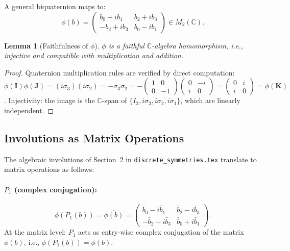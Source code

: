 \documentclass[12pt,a4paper]{article}
\newtheorem{lemma}[theorem]{Lemma}
\theoremstyle{definition}
\theoremstyle{remark}
\begin{document}
A general biquaternion maps to:
\begin{equation}
  \phi(b) = \begin{pmatrix}
    b_0 + ib_1 & b_2 + ib_3 \\
    -b_2 + ib_3 & b_0 - ib_1
  \end{pmatrix} \in M_2(\mathbb{C}).
  \label{eq:mat:general_2x2}
\end{equation}

\begin{lemma}[Faithfulness of $\phi$]
$\phi$ is a faithful $\mathbb{C}$-algebra homomorphism, i.e., injective and
compatible with multiplication and addition.
\end{lemma}
\begin{proof}
Quaternion multiplication rules are verified by direct computation:
$\phi(\mathbf{I})\phi(\mathbf{J}) = (i\sigma_3)(i\sigma_2) = -\sigma_3\sigma_2
= -\begin{pmatrix}1&0\\0&-1\end{pmatrix}\begin{pmatrix}0&-i\\i&0\end{pmatrix}
= \begin{pmatrix}0&i\\i&0\end{pmatrix} = \phi(\mathbf{K})$. \checkmark
Injectivity: the image is the $\mathbb{C}$-span of
$\{I_2, i\sigma_3, i\sigma_2, i\sigma_1\}$, which are linearly independent.
\end{proof}

\subsection{Involutions as Matrix Operations}

The algebraic involutions of Section~2 in \texttt{discrete\_symmetries.tex}
translate to matrix operations as follows:

\paragraph{$P_1$ (complex conjugation):}
\begin{equation}
  \phi(P_1(b)) = \overline{\phi(b)} = \begin{pmatrix}
    \bar b_0 - i\bar b_1 & \bar b_2 - i\bar b_3 \\
    -\bar b_2 - i\bar b_3 & \bar b_0 + i\bar b_1
  \end{pmatrix}.
  \label{eq:mat:P1_matrix}
\end{equation}
At the matrix level: $P_1$ acts as entry-wise complex conjugation of the
matrix $\phi(b)$, i.e., $\phi(P_1(b)) = \overline{\phi(b)}$.
\end{document}

